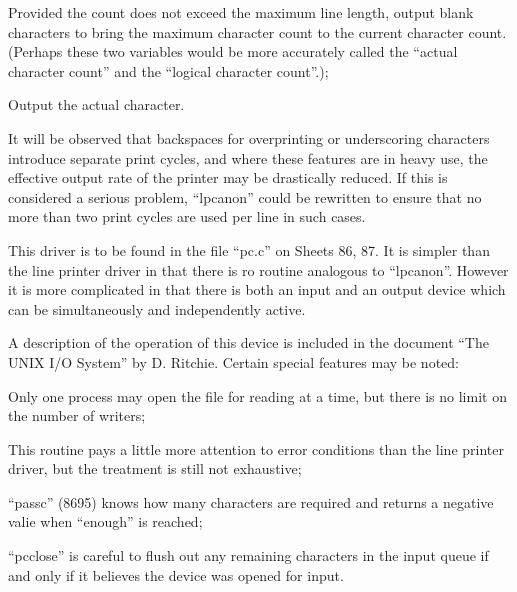 \item[8954:] Provided the
count does not exceed the maximum
line length, output blank characters to
bring the maximum character count to the
current character count. (Perhaps these two
variables would be more accurately called the
``actual character count'' and the ``logical character count''.);

\item[8959:] Output the actual character.
\ed


It will be observed that backspaces for
overprinting or underscoring characters
introduce separate print cycles, and
where these features are in heavy use,
the effective output rate of the
printer may be drastically reduced. If
this is considered a serious problem,
``lpcanon'' could be rewritten to ensure
that no more than two print cycles are
used per line in such cases.


This driver is to be found in the file
``pc.c'' on Sheets 86, 87. It is simpler
than the line printer driver in that
there is ro routine analogous to
``lpcanon''. However it is more complicated in that there is both an input
and an output device which can be
simultaneously and independently
active.

A description of the operation of this
device is included in the document ``The
UNIX I/O System'' by D. Ritchie. Certain
special features may be noted:

\bd
\item[(1)] Only one process may open the file
for reading at a time, but there is no
limit on the number of writers;

\item[(2)] This routine pays a little more
attention to error conditions than the
line printer driver, but the treatment
is still not exhaustive;

\item[(3)] ``passc'' (8695) knows how many
characters are required and returns a
negative valie when ``enough'' is
reached;

\item[(4)] ``pcclose'' is careful to flush out
any remaining characters in the input
queue if and only if it believes the
device was opened for input.
\ed
